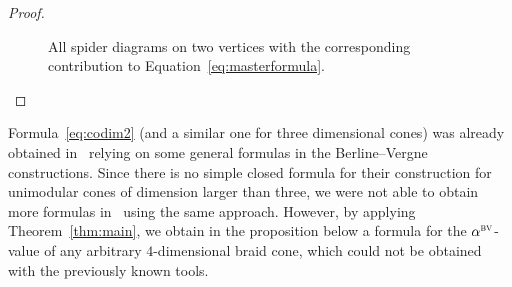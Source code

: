 \documentclass[ALCO,ThmDefs,Unicode,epreuves]{cedram}
\newcommand{\bv}{\alpha^{\textsc{bv}}}
\begin{document}
\begin{proof}
\begin{figure}[ht]
		\label{fig:2}
		\caption{All spider diagrams on two vertices with the corresponding contribution to Equation~\eqref{eq:masterformula}.}
	\end{figure}
\end{proof}


Formula~\eqref{eq:codim2} (and a similar one for three dimensional cones) was already obtained in~\cite{bvalpha} relying on some general formulas in the Berline--Vergne constructions. Since there is no simple closed formula for their construction for unimodular cones of dimension larger than three, we were not able to obtain more formulas in~\cite{bvalpha} using the same approach. 
However, by applying Theorem~\ref{thm:main}, we obtain in the proposition below a formula for the $\bv$-value of any arbitrary $4$-dimensional braid cone, which could not be obtained with the previously known tools.
\end{document}
